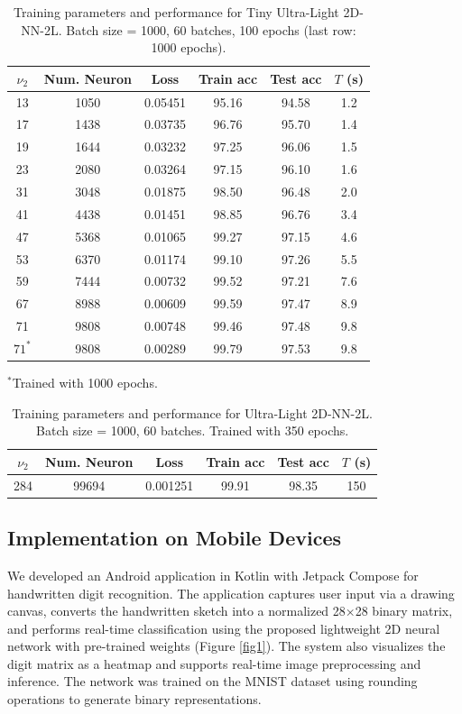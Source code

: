 \documentclass[pdflatex,sn-mathphys-num]{sn-jnl}%
\theoremstyle{thmstyleone}%
\theoremstyle{thmstyletwo}%
\theoremstyle{thmstylethree}%
\begin{document}
\begin{table}[htbp]
\centering
\caption{Training parameters and performance for Tiny Ultra-Light 2D-NN-2L.
Batch size = 1000, 60 batches, 100 epochs (last row: 1000 epochs).}
\label{tab:2}
\begin{tabular}{cccccc}
\toprule
$\nu_2$ & Num. Neuron & Loss    & Train acc & Test acc & $T$ (s) \\
\midrule
13      & 1050  & 0.05451 & 95.16  & 94.58  & 1.2 \\
17      & 1438  & 0.03735 & 96.76  & 95.70  & 1.4 \\
19      & 1644  & 0.03232 & 97.25  & 96.06  & 1.5 \\
23      & 2080  & 0.03264 & 97.15  & 96.10  & 1.6 \\
31      & 3048  & 0.01875 & 98.50  & 96.48  & 2.0 \\
41      & 4438  & 0.01451 & 98.85  & 96.76  & 3.4 \\
47      & 5368  & 0.01065 & 99.27  & 97.15  & 4.6 \\
53      & 6370  & 0.01174 & 99.10  & 97.26  & 5.5 \\
59      & 7444  & 0.00732 & 99.52  & 97.21  & 7.6 \\
67      & 8988  & 0.00609 & 99.59  & 97.47  & 8.9 \\
71      & 9808  & 0.00748 & 99.46  & 97.48  & 9.8 \\
$71^{*}$ & 9808& 0.00289 & 99.79  & 97.53  & 9.8 \\
\bottomrule
\end{tabular}%
\parbox[t]{\textwidth}{\small{$^{*}$Trained with 1000 epochs.}}
\end{table}

\begin{table}[htbp]
\centering
\caption{Training parameters and performance for Ultra-Light 2D-NN-2L.
Batch size = 1000, 60 batches. Trained with 350 epochs.}
\label{tab:3}
\begin{tabular}{|c|c|c|c|c|c|}
\hline
$\nu_2$ & Num. Neuron & Loss    & Train acc & Test acc & $T$ (s) \\
\hline
284 & 99694& 0.001251  &   99.91       & 98.35
& 150 \\
\hline
\end{tabular}
\end{table}
\subsection{Implementation on Mobile Devices}
We developed an Android application in Kotlin with Jetpack Compose for handwritten digit recognition. The application captures user input via a drawing canvas, converts the handwritten sketch into a normalized 28×28 binary matrix, and performs real-time classification using the proposed lightweight 2D neural network with pre-trained weights (Figure \ref{fig1}). The system also visualizes the digit matrix as a heatmap and supports real-time image preprocessing and inference. The network was trained on the MNIST dataset using rounding operations to generate binary representations.
\end{document}
